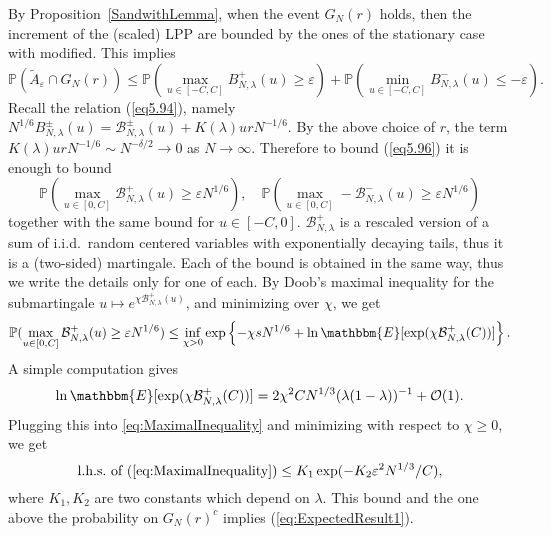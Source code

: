\documentclass[12pt,a4paper]{article}
\numberwithin{equation}{section}
\newcommand{\Or}{\mathcal{O}}
\newcommand{\Pb}{\mathbb{P}}
\newcommand{\E}{\mathbbm{E}}
\newcommand{\e}{\varepsilon}
\begin{document}
By Proposition~\ref{SandwithLemma}, when the event $G_N(r)$ holds, then the increment of the (scaled) LPP are bounded by the ones of the stationary case with modified. This implies
\begin{equation}\label{eq5.96}
\Pb(\widetilde A_\e\cap G_N(r)) \leq \Pb\left(\max_{u\in [-C,C]} B^{+}_{N,\lambda}(u)\geq \e\right) + \Pb\left(\min_{u\in [-C,C]} B^{-}_{N,\lambda}(u)\leq -\e\right).
\end{equation}
Recall the relation (\ref{eq5.94}), namely $N^{1/6} B^{\pm}_{N,\lambda}(u)=\mathcal{B}^\pm_{N,\lambda}(u)+K(\lambda)u r N^{-1/6}$. By the above choice of $r$, the term $K(\lambda)u r N^{-1/6}\sim N^{-\delta/2}\to 0$ as $N\to\infty$. Therefore to bound (\ref{eq5.96}) it is enough to bound
\begin{equation}
\Pb\left(\max_{u\in[0,C]}\mathcal{B}^+_{N,\lambda}(u)\geq \e N^{1/6}\right),\quad\Pb\left(\max_{u\in[0,C]}-\mathcal{B}^-_{N,\lambda}(u)\geq \e N^{1/6}\right)
\end{equation}
together with the same bound for $u\in [-C,0]$. $\mathcal{B}^+_{N,\lambda}$ is a rescaled version of a sum of i.i.d.\ random centered variables with exponentially decaying tails, thus it is a (two-sided) martingale. Each of the bound is obtained in the same way, thus we write the details only for one of each.
By Doob's maximal inequality for the submartingale $u\mapsto e^{\chi \mathcal{B}^{+}_{N,\lambda}(u)}$, and minimizing over $\chi$, we get
\begin{equation}\label{eq:MaximalInequality}
\Pb(\max_{u\in[0,C]}\mathcal{B}^+_{N,\lambda}(u)\geq \e N^{1/6})\leq \inf_{\chi>0} \exp\left\{-\chi sN^{1/6}+\ln \E[\exp(\chi\mathcal{B}^{+}_{N,\lambda}(C))]\right\}.
\end{equation}
A simple computation gives
\begin{equation}
\ln \E[\exp(\chi\mathcal{B}^{+}_{N,\lambda}(C))] = 2 \chi^2 C N^{1/3} (\lambda(1-\lambda))^{-1}+\Or(1).
\end{equation}
Plugging this into \eqref{eq:MaximalInequality} and minimizing with respect to $\chi\geq 0$, we get
\begin{equation}
\textrm{l.h.s.~of}~(\ref{eq:MaximalInequality})\leq K_1 \exp(-K_2 \e^2 N^{1/3}/C),
\end{equation}
where $K_1,K_2$ are two constants which depend on $\lambda$. This bound and the one above the probability on $G_N(r)^c$ implies (\ref{eq:ExpectedResult1}).
\end{document}
